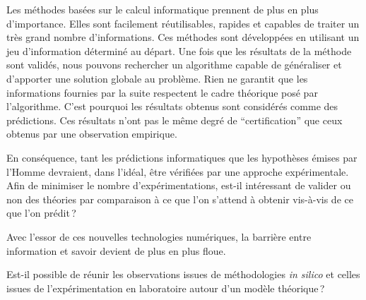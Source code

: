 \begin{refsegment}

Les méthodes basées sur le calcul informatique prennent de plus en plus d'importance. Elles sont facilement réutilisables, rapides et capables de traiter un très grand nombre d'informations. Ces méthodes sont développées en utilisant un jeu d'information déterminé au départ. Une fois que les résultats de la méthode sont validés, nous pouvons rechercher un algorithme capable de généraliser et d'apporter une solution globale au problème. Rien ne garantit que les informations fournies par la suite respectent le cadre théorique posé par l'algorithme. C'est pourquoi les résultats obtenus sont considérés comme des prédictions. Ces résultats n'ont pas le même degré de “certification” que ceux obtenus par une observation empirique.

En conséquence, tant les prédictions informatiques que les hypothèses émises par l'Homme devraient, dans l'idéal, être vérifiées par une approche expérimentale. Afin de minimiser le nombre d'expérimentations, est-il intéressant de valider ou non des théories par comparaison à ce que l'on s'attend à obtenir vis-à-vis de ce que l'on prédit ?

Avec l'essor de ces nouvelles technologies numériques, la barrière entre information et savoir devient de plus en plus floue.



Est-il possible de réunir les observations issues de méthodologies \textit{in silico} et celles issues de l'expérimentation en laboratoire autour d'un modèle théorique ?


\end{refsegment}
